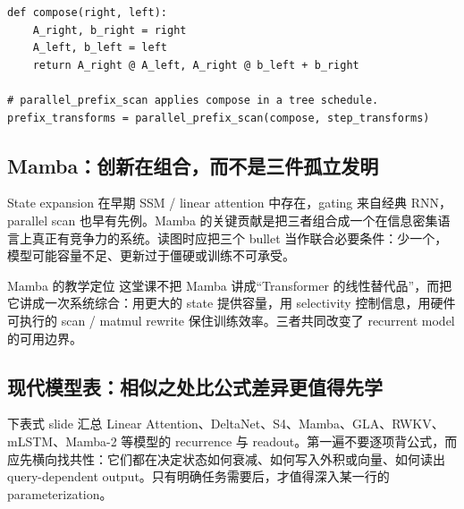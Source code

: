\begin{lstlisting}[caption={Affine recurrence 的 associative composition}]
def compose(right, left):
    A_right, b_right = right
    A_left, b_left = left
    return A_right @ A_left, A_right @ b_left + b_right

# parallel_prefix_scan applies compose in a tree schedule.
prefix_transforms = parallel_prefix_scan(compose, step_transforms)
\end{lstlisting}


\subsection{Mamba：创新在组合，而不是三件孤立发明}

State expansion 在早期 SSM / linear attention 中存在，gating 来自经典 RNN，parallel scan 也早有先例。Mamba 的关键贡献是把三者组合成一个在信息密集语言上真正有竞争力的系统。读图时应把三个 bullet 当作联合必要条件：少一个，模型可能容量不足、更新过于僵硬或训练不可承受。


\begin{importantbox}{Mamba 的教学定位}
这堂课不把 Mamba 讲成“Transformer 的线性替代品”，而把它讲成一次系统综合：用更大的 state 提供容量，用 selectivity 控制信息，用硬件可执行的 scan / matmul rewrite 保住训练效率。三者共同改变了 recurrent model 的可用边界。
\end{importantbox}

\subsection{现代模型表：相似之处比公式差异更值得先学}

下表式 slide 汇总 Linear Attention、DeltaNet、S4、Mamba、GLA、RWKV、mLSTM、Mamba-2 等模型的 recurrence 与 readout。第一遍不要逐项背公式，而应先横向找共性：它们都在决定状态如何衰减、如何写入外积或向量、如何读出 query-dependent output。只有明确任务需要后，才值得深入某一行的 parameterization。


